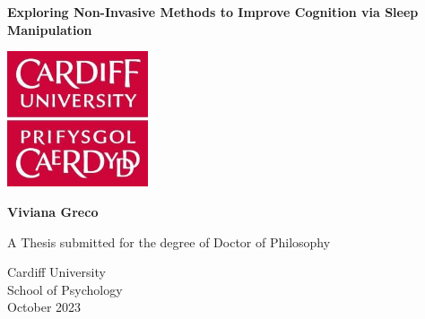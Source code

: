 \begin{titlepage}
\vspace*{\fill}

\begin{center}

	\Huge
	{\textbf{Exploring Non-Invasive Methods to Improve Cognition via Sleep Manipulation}}
 	
 	\vspace{2cm}
     \begin{minipage}[c][4.5cm][c]{\textwidth}
        \centering     
		\includegraphics[height=4cm]{./0_Front_matter/graphics - front matter//Cardiff Uni Logo.png}%
	\end{minipage}%

    \vspace{1cm}
    \large \textbf{Viviana Greco\\}
 
	\vspace{3cm}
 
	\begin{minipage}{0.9\textwidth} 
    \centering %
	A Thesis submitted for the degree of Doctor of Philosophy
 
	\vspace{1cm}
    \large {Cardiff University\\}
    	\vspace{0.2cm}
    \large {School of Psychology\\}
    	\vspace{0.2cm}
    \large {October 2023\\}

	
    \end{minipage}
    \end{center}


\vspace*{\fill}

		

\end{titlepage}
